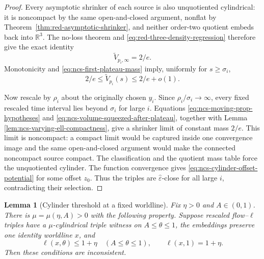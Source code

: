 \documentclass[10pt]{coll-l}
\newcommand{\R}{\mathbb{R}}
\newtheorem{lemma}[theorem]{Lemma}
\theoremstyle{definition}
\theoremstyle{remark}
\numberwithin{section}{chapter}
\numberwithin{equation}{chapter}
\begin{document}
\begin{proof}
Every asymptotic shrinker of each source is also unquotiented cylindrical:
it is noncompact by the same open-and-closed argument, nonflat by
Theorem~\ref{thm:red-asymptotic-shrinker}, and neither order-two quotient
embeds back into $\R^3$.  The no-loss theorem and
\eqref{eq:red-three-density-regression} therefore give the exact identity
\begin{equation}
                    \widetilde V_{p_i,\infty}=2/e.      \label{eq:ncs-source-asymptotic-mass}
\end{equation}
Monotonicity and \eqref{eq:ncs-first-plateau-mass} imply, uniformly for
$s\geq\sigma_i$,
\begin{equation}
             2/e\leq\widetilde V_{p_i}(s)\leq2/e+o(1). \label{eq:ncs-volume-squeezed-after-plateau}
\end{equation}

Now rescale by $\rho_i$ about the originally chosen $y_i$.  Since
$\rho_i/\sigma_i\to\infty$, every fixed rescaled time interval lies beyond
$\sigma_i$ for large $i$.  Equations
\eqref{eq:ncs-moving-prop-hypotheses} and
\eqref{eq:ncs-volume-squeezed-after-plateau}, together with Lemma
\ref{lem:ncs-varying-ell-compactness}, give a shrinker limit of constant
mass $2/e$.  This limit is noncompact: a compact limit would be captured
inside one convergence image and the same open-and-closed argument would
make the connected noncompact source compact.  The classification and the quotient mass table force the
unquotiented cylinder.  The function convergence gives
\eqref{eq:ncs-cylinder-offset-potential} for some offset $z_0$.  Thus the
triples are $\widehat\varepsilon$-close for all large $i$, contradicting
their selection.
\end{proof}

\begin{lemma}[Cylinder threshold at a fixed worldline]
\label{lem:ncs-cylinder-threshold}
Fix $\eta>0$ and $A\in(0,1)$.  There is
$\mu=\mu(\eta,A)>0$ with the following property.  Suppose rescaled
flow--$\ell$ triples have a $\mu$-cylindrical triple witness on
$A\leq\theta\leq1$, the embeddings preserve one identity worldline $x$,
and
\begin{equation}
 \ell(x,\theta)\leq1+\eta\quad(A\leq\theta\leq1),\qquad
 \ell(x,1)=1+\eta.                                    \label{eq:ncs-threshold-crossing-data}
\end{equation}
Then these conditions are inconsistent.
\end{lemma}
\end{document}
